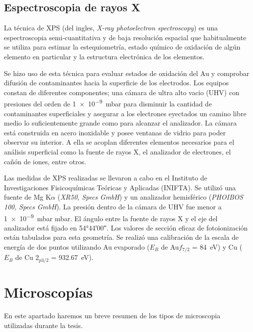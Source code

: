 	\subsection{Espectroscopia de rayos X}

		La técnica de XPS (del ingles, \textit {X-ray photoelectron spectroscopy}) es una espectroscopia semi-cuantitativa y de baja resolución espacial que habitualmente se utiliza para estimar la estequiometría, estado químico de oxidación de algún elemento en particular y la estructura electrónica de los elementos.

		Se hizo uso de esta técnica para evaluar estados de oxidación del Au y comprobar difusión de contaminantes hacia la superficie de los electrodos.  Los equipos constan de diferentes componentes; una cámara de ultra alto vacio (UHV) con presiones del orden de \SI{1e-9}{mbar} para disminuir la cantidad de contaminantes superficiales y asegurar a los electrones eyectados un camino libre medio lo suficientemente grande como para alcanzar el analizador. La cámara está construida en acero inoxidable y posee ventanas de vidrio para poder observar su interior. A ella se acoplan diferentes elementos necesarios para el análisis superficial como la fuente de rayos X, el analizador de electrones, el cañón de iones, entre otros.\cite{XPS1978,Corthey2012}

		Las medidas de XPS realizadas se llevaron a cabo en el Instituto de Investigaciones Fisicoquímicas Teóricas y Aplicadas (INIFTA). Se utilizó una fuente de Mg K$\alpha$ (\textit{XR50, Specs GmbH}) y un analizador hemisférico (\textit{PHOIBOS 100, Specs GmbH}). La presión dentro de la cámara de UHV fue menor a \SI{1e-9}{mbar} mbar. El ángulo entre la fuente de rayos X y el eje del analizador está fijado en \ang{54;44;00}. Los valores de sección eficaz de fotoionización están tabulados para esta geometría. Se realizó una calibración de la escala de energía de dos puntos utilizando Au evaporado ($E_B$ de Au$f_{7/2}$ = \SI{84}{\electronvolt}) y Cu ($E_B$ de Cu $2_{p3/2}$ = \SI{932.67}{\electronvolt}).
		
\section{Microscopías}
		
	En este apartado haremos un breve resumen de los tipos de microscopia utilizadas durante la tesis.

